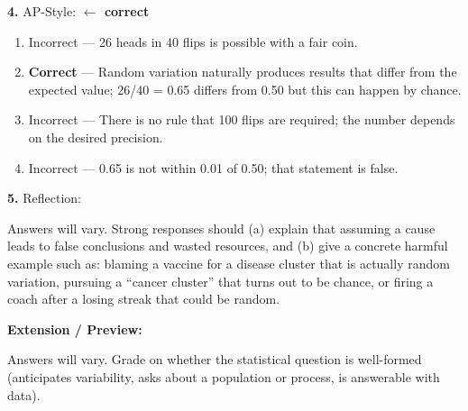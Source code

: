 \documentclass[10pt]{article}
\begin{document}
\begin{practicebox}
\vspace{6pt}
\textbf{4.} AP-Style:  \textcolor{keyred}{\textbf{$\leftarrow$ correct}}
\begin{enumerate}[label=(\Alph*), leftmargin=2em, itemsep=2pt]
  \item Incorrect --- 26 heads in 40 flips is possible with a fair coin.
  \item \textbf{Correct} --- Random variation naturally produces results that differ from the expected value; 26/40 = 0.65 differs from 0.50 but this can happen by chance.
  \item Incorrect --- There is no rule that 100 flips are required; the number depends on the desired precision.
  \item Incorrect --- 0.65 is not within 0.01 of 0.50; that statement is false.
\end{enumerate}

\vspace{6pt}
\textbf{5.} Reflection:
\begin{teachernote}
Answers will vary. Strong responses should (a) explain that assuming a cause leads to false conclusions and wasted resources, and (b) give a concrete harmful example such as: blaming a vaccine for a disease cluster that is actually random variation, pursuing a ``cancer cluster'' that turns out to be chance, or firing a coach after a losing streak that could be random.
\end{teachernote}

\vspace{6pt}
\textbf{Extension / Preview:}
\begin{teachernote}
Answers will vary. Grade on whether the statistical question is well-formed (anticipates variability, asks about a population or process, is answerable with data).
\end{teachernote}

\end{practicebox}
\end{document}
